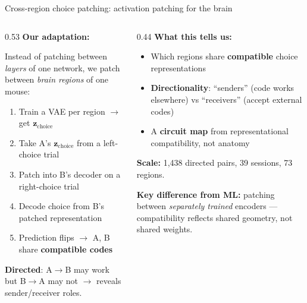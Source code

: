 \documentclass[aspectratio=169,11pt]{beamer}
\begin{document}
\begin{frame}{Cross-region choice patching: activation patching for the brain}

\begin{columns}[T]
\begin{column}{0.53\textwidth}
\textbf{Our adaptation:}

\vspace{0.3em}
{\small Instead of patching between \emph{layers} of one network, we patch between \emph{brain regions} of one mouse:}

\vspace{0.3em}
{\small
\begin{enumerate}\setlength\itemsep{0.3em}
  \item Train a VAE per region $\to$ get $\mathbf{z}_{\text{choice}}$
  \item Take A's $\mathbf{z}_{\text{choice}}$ from a left-choice trial
  \item Patch into B's decoder on a right-choice trial
  \item Decode choice from B's patched representation
  \item Prediction flips $\to$ A, B share \textbf{compatible codes}
\end{enumerate}
}

\vspace{0.3em}
{\small \textbf{Directed}: A$\to$B may work but B$\to$A may not $\to$ reveals sender/receiver roles.}
\end{column}

\begin{column}{0.44\textwidth}
\textbf{What this tells us:}

\vspace{0.3em}
{\small
\begin{itemize}\setlength\itemsep{0.3em}
  \item Which regions share \textbf{compatible} choice representations
  \item \textbf{Directionality}: ``senders'' (code works elsewhere) vs ``receivers'' (accept external codes)
  \item A \textbf{circuit map} from representational compatibility, not anatomy
\end{itemize}
}

\vspace{0.3em}
{\small \textbf{Scale:} 1,438 directed pairs, 39 sessions, 73 regions.}

\vspace{0.2em}
{\small \textbf{Key difference from ML:} patching between \emph{separately trained} encoders --- compatibility reflects shared geometry, not shared weights.}
\end{column}
\end{columns}
\end{frame}
\end{document}
